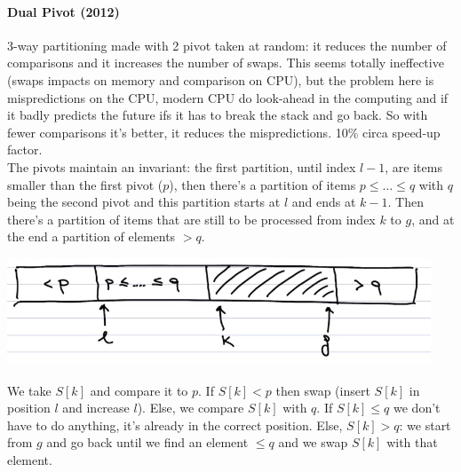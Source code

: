 \documentclass[10pt]{report}
\begin{document}
\paragraph{Dual Pivot (2012)} 3-way partitioning made with 2 pivot taken at random: it reduces the number of comparisons and it increases the number of swaps. This seems totally ineffective (swaps impacts on memory and comparison on CPU), but the problem here is mispredictions on the CPU, modern CPU do look-ahead in the computing and if it badly predicts the future ifs it has to break the stack and go back. So with fewer comparisons it's better, it reduces the mispredictions. 10\% circa speed-up factor.\\
The pivots maintain an invariant: the first partition, until index $l-1$, are items smaller than the first pivot ($p$), then there's a partition of items $p\leq \ldots \leq q$ with $q$ being the second pivot and this partition starts at $l$ and ends at $k-1$. Then there's a partition of items that are still to be processed from index $k$ to $g$, and at the end a partition of elements $> q$.
\begin{center}
	\includegraphics[scale=1]{7.png}
\end{center}
We take $S[k]$ and compare it to $p$. If $S[k]<p$ then swap (insert $S[k]$ in position $l$ and increase $l$). Else, we compare $S[k]$ with $q$. If $S[k]\leq q$ we don't have to do anything, it's already in the correct position. Else, $S[k] > q$: we start from $g$ and go back until we find an element $\leq q$ and we swap $S[k]$ with that element.
\end{document}
